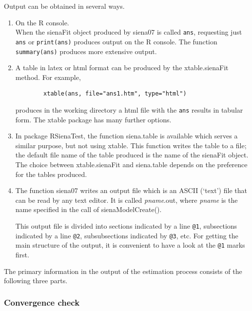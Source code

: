 \documentclass[a4paper,fleqn,11pt]{article}
\newcommand{\+}{\, + \,}
\newcommand{\sfn}[1]{\textsf{#1}}
\newcommand{\R}{{\sf R }}
\begin{document}
Output can be obtained in several ways.
\begin{enumerate}
  \item On the \R console.\\
        When the \textsf{sienaFit} object produced by \textsf{siena07}
        is called \texttt{ans},
        requesting just \texttt{ans} or \texttt{print(ans)}
        produces output on the \R console. The function
        \texttt{summary(ans)} produces more extensive output.
  \item A table in latex or html format can be produced by the
        \textsf{xtable.sienaFit} method.
        For example,
        \begin{verbatim}
        xtable(ans, file="ans1.htm", type="html")
        \end{verbatim}
        produces in the working directory a html file with the \texttt{ans}
        results in
        tabular form. The \textsf{xtable} package has many further options.\\
  \item In package \sfn{RSienaTest}, the function \sfn{siena.table}
        is available which serves a similar purpose,
        but not using \textsf{xtable}.
        This function writes the table to a file;
        the default file name of the table produced is the name of the
        \sfn{sienaFit} object.
        The choice between \textsf{xtable.sienaFit} and \sfn{siena.table}
        depends on the preference for the tables produced.
  \item The function \textsf{siena07}
        writes an output file which is an ASCII (`text') file that can be
        read by any text editor.
        It is called \textsf{\textsl{pname}.out},
        where \textsf{\textsl{pname}} is the name
        specified in the call of \textsf{sienaModelCreate()}.

        This output file is divided into sections
        indicated by a line {\tt @1},
        subsections indicated by a line {\tt @2}, subsubsections indicated
        by {\tt @3}, etc. For getting the main structure of the output, it
        is convenient to have a look at the {\tt @1} marks first.
\end{enumerate}

The primary information in the output of the estimation process
consists of the following three parts.

\subsubsection{Convergence check}
\end{document}
